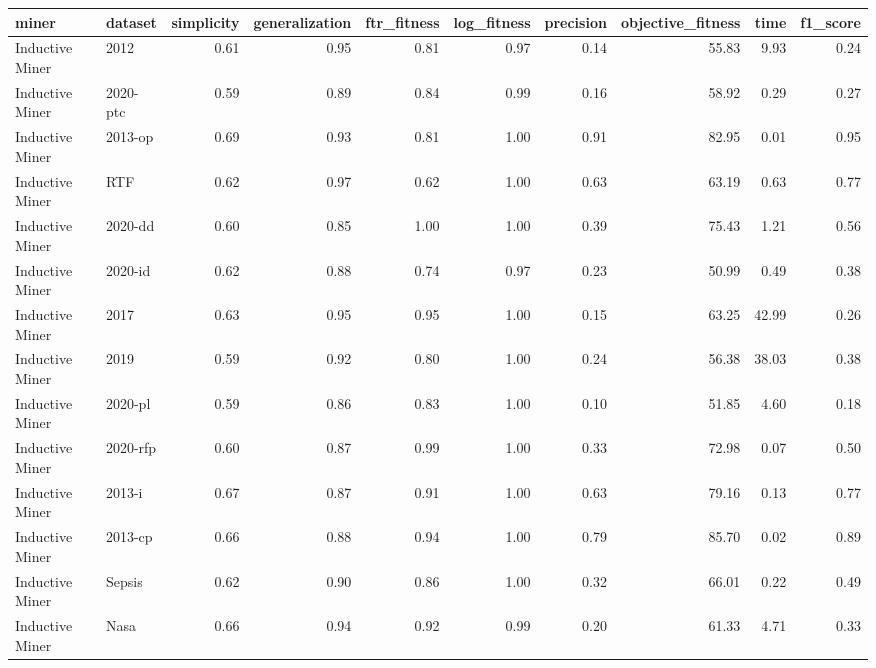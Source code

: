 \begin{tabular}{llrrrrrrrr}
\toprule
miner & dataset & simplicity & generalization & ftr_fitness & log_fitness & precision & objective_fitness & time & f1_score \\
\midrule
Inductive Miner & 2012 & 0.61 & 0.95 & 0.81 & 0.97 & 0.14 & 55.83 & 9.93 & 0.24 \\
Inductive Miner & 2020-ptc & 0.59 & 0.89 & 0.84 & 0.99 & 0.16 & 58.92 & 0.29 & 0.27 \\
Inductive Miner & 2013-op & 0.69 & 0.93 & 0.81 & 1.00 & 0.91 & 82.95 & 0.01 & 0.95 \\
Inductive Miner & RTF & 0.62 & 0.97 & 0.62 & 1.00 & 0.63 & 63.19 & 0.63 & 0.77 \\
Inductive Miner & 2020-dd & 0.60 & 0.85 & 1.00 & 1.00 & 0.39 & 75.43 & 1.21 & 0.56 \\
Inductive Miner & 2020-id & 0.62 & 0.88 & 0.74 & 0.97 & 0.23 & 50.99 & 0.49 & 0.38 \\
Inductive Miner & 2017 & 0.63 & 0.95 & 0.95 & 1.00 & 0.15 & 63.25 & 42.99 & 0.26 \\
Inductive Miner & 2019 & 0.59 & 0.92 & 0.80 & 1.00 & 0.24 & 56.38 & 38.03 & 0.38 \\
Inductive Miner & 2020-pl & 0.59 & 0.86 & 0.83 & 1.00 & 0.10 & 51.85 & 4.60 & 0.18 \\
Inductive Miner & 2020-rfp & 0.60 & 0.87 & 0.99 & 1.00 & 0.33 & 72.98 & 0.07 & 0.50 \\
Inductive Miner & 2013-i & 0.67 & 0.87 & 0.91 & 1.00 & 0.63 & 79.16 & 0.13 & 0.77 \\
Inductive Miner & 2013-cp & 0.66 & 0.88 & 0.94 & 1.00 & 0.79 & 85.70 & 0.02 & 0.89 \\
Inductive Miner & Sepsis & 0.62 & 0.90 & 0.86 & 1.00 & 0.32 & 66.01 & 0.22 & 0.49 \\
Inductive Miner & Nasa & 0.66 & 0.94 & 0.92 & 0.99 & 0.20 & 61.33 & 4.71 & 0.33 \\
\bottomrule
\end{tabular}